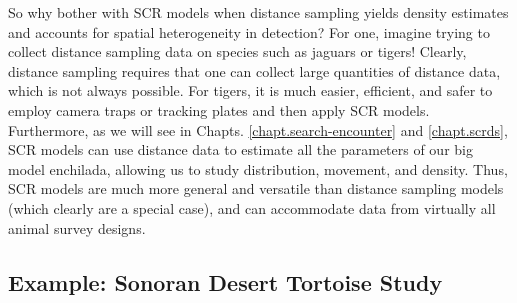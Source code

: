 So why bother with SCR models when distance sampling yields density
estimates and accounts for spatial heterogeneity in detection? For
one, imagine trying to collect distance sampling data on species such
as jaguars or tigers!  Clearly, distance sampling requires that one
can collect large quantities of distance data, which is not always
possible. For tigers, it is much easier, efficient, and safer to
employ camera traps or tracking plates and then apply SCR
models. Furthermore, as we will see in Chapts.
\ref{chapt.search-encounter} and \ref{chapt.scrds}, SCR models can use
distance data to estimate all the parameters of our big model
enchilada, allowing us to study distribution, movement, and
density. Thus, SCR models are much more general and versatile than
distance sampling models (which clearly are a special case), and can
accommodate data from virtually all animal survey designs.

\subsection{Example: Sonoran Desert Tortoise Study}

